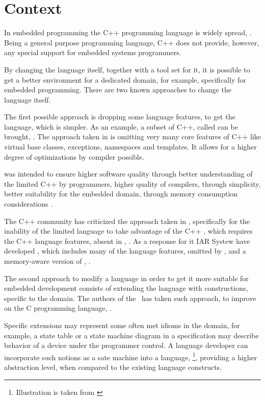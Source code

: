 
\section{Context}

In embedded programming the C++ programming language is widely spread, \cite{embedlangs}. Being a general purpose 
programming language, C++ does not provide, however, any special support for embedded systems programmers. 

By changing  the language itself, together with a tool set for it, it is possible to get a better environment 
for a dedicated domain, for example, specifically for embedded programming. There are two known approaches to change
the language itself.

The first possible approach is dropping some language features, to get the language, which is simpler. 
As an example, a subset of C++, called  can be brought, \cite{emcpp}. The approach taken in  is 
omitting very many core features of C++ like virtual base classes, exceptions, namespaces and templates. 
It allows for a higher degree of optimizations by compiler possible. 

 was intended to ensure higher software quality through better understanding of the limited 
C++ by programmers, higher quality of compilers, through simplicity, better suitability for the embedded domain, through
memory consumption considerations \cite{stripepp}. 

The C++ community has criticized the approach taken in , specifically for the inability of the 
limited language to take advantage of the C++ , which requires the C++ language features, absent in 
, \cite{stremcpp}. As a response for it IAR Systew have developed , which includes many of the language features,
omitted by , and a memory-aware version of , \cite{extendedembeddedcpp}.

The second approach to modify a language in order to get it more suitable for embedded development consists of extending 
the language with constructions, specific to the domain. The authors of the \mbdp\ has taken such approach, to improve on
the C programming language, \cite{2012_voelter_mbeddr_extensible_c_based_language_and_ide_for_embedded}. 

Specific extensions may represent some often met idioms in the domain, for example, 
a state table or  a state machine diagram in a specification may describe behavior of a device under the 
programmer control. A language developer can incorporate such notions as a sate machine into a language, \footnote{Illustration is taken from \cite{2012_ratiu_modular_dsls_and_analyses} }, 
providing a higher abstraction level, when compared to the existing language constructs. 

